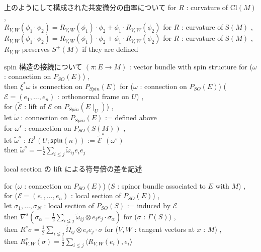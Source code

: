 \begin{Theorem}
\itemnote
  上のようにして構成された共変微分の曲率について
\itemprop
  for \(R\) : curvature of \(\text{Cl}(M)\) ,\\
  \(R_{V , W} (\phi_1 \cdot \phi_2) = R_{V , W} (\phi_1) \cdot \phi_2 + \phi_1 \cdot R_{V , W}(\phi_2)\)
\itemprop
  for \(R\) : curvature of \(\text{S}(M)\) ,\\
  \(R_{V , W} (\phi_1 \cdot \phi_2) = R_{V , W} (\phi_1) \cdot \phi_2 + \phi_1 \cdot R_{V , W}(\phi_2)\)
\itemprop
  for \(R\) : curvature of \(\text{S}(M)\) ,\\
  \(R_{V , W}\) preserves \(S^{\pm}(M)\) if they are defined
\end{Theorem}

\begin{Theorem}
\itemnote
  spin 構造の接続について
\itemwhen \((\pi : E \to M)\) : vector bundle with spin structure
\itemprop
  for (\(\omega\) : connection on \(P_{SO}(E)\)) ,\\
  then \(\xi^*\omega\) is connection on \(P_{Spin}(E)\)
\itemprop
  for (\(\omega\) : connection on \(P_{SO}(E)\)) (\(\mathcal{E} = (e_1 , \ldots , e_n)\) : orthonormal frame on \(U\)) ,\\
  for (\(\tilde{\mathcal{E}}\) : lift of \(\mathcal{E}\) on \(P_{Spin}(E \mid _{U})\)) ,\\
  let \(\tilde{\omega}\) : connection on \(P_{Spin}(E)\) := defined above \\
  for \(\omega^s\) : connection on \(P_{SO}(S(M))\) ,\\
  let \(\tilde{\omega}^s\) : \(\Omega^1(U ; \mathfrak{spin}(n))\) := \(\tilde{\mathcal{E}}^*(\omega^s)\) \\
  then \(\tilde{\omega}^s = -\frac{1}{2}\sum_{i \lneq j} \tilde{\omega}_{ij} e_i e_j\)
\end{Theorem}

\begin{Theorem}
\itemnote
  local section の lift による符号倍の差を記述
\itemprop
  \WIP
\end{Theorem}

\begin{Theorem}
\itemprop
  for (\(\omega\) : connection on \(P_{SO}(E)\)) (\(S\) : spinor bundle associated to \(E\) with \(M\)) ,\\
  for (\(\mathcal{E} = (e_1 , \ldots , e_n)\) : local section of \(P_{SO}(E)\)) ,\\
  let \(\sigma_1 , \ldots , \sigma_N\) : local section of \(P_{SO}(S)\) := induced by \(\mathcal{E}\) \\
  then \(\nabla^s (\sigma_{\alpha} = \frac{1}{2}\sum_{i \lneq j} \tilde{\omega}_{ij} \otimes e_i e_j \cdot \sigma_{\alpha})\)
\itemprop
  for (\(\sigma\) : \(\Gamma(S)\)) ,\\
  then \(R^s \sigma = \frac{1}{2}\sum_{i \lneq j} \tilde{\Omega}_{ij} \otimes e_i e_j \cdot \sigma\)
\itemprop
  for (\(V , W\) : tangent vectors at \(x\) : \(M\)) ,\\
  then \(R_{V , W}^s(\sigma) = \frac{1}{2}\sum_{i \lneq j}\langle R_{V , W}(e_i) , e_i \rangle \)
\end{Theorem}

